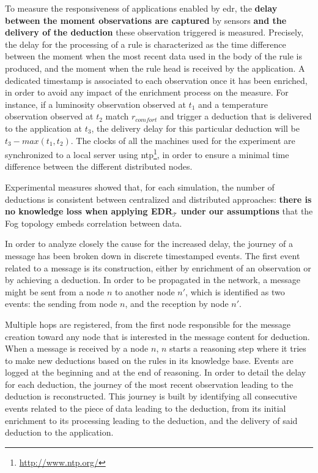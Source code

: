 \documentclass[sw]{iosart2x}
\newcommand{\edrt}{EDR$_{\mathcal{T}}$\xspace}
\begin{document}
To measure the responsiveness of applications enabled by \gls{edr}, the \textbf{delay between the moment observations are captured} by sensors \textbf{and the delivery of the deduction} these observation triggered is measured.
Precisely, the delay for the processing of a rule is characterized as the time difference between the moment when the most recent data used in the body of the rule is produced, and the moment when the rule head is received by the application.
A dedicated time\-stamp is associated to each observation once it has been enriched, in order to avoid any impact of the enrichment process on the measure.
For instance, if a luminosity observation observed at $t_{1}$ and a temperature observation observed at $t_{2}$ match $r_{comfort}$ and trigger a deduction that is delivered to the application at $t_{3}$, the delivery delay for this particular deduction will be $t_3 - max(t_1, t_2)$.
The clocks of all the machines used for the experiment are synchronized to a local server using \gls{ntp}\footnote{\url{http://www.ntp.org/}}, in order to ensure a minimal time difference between the different distributed nodes.

Experimental measures showed that, for each simulation, the number of deductions is consistent between centralized and distributed approaches: \textbf{there is no knowledge loss when applying \edrt under our assumptions} that the Fog topology embeds correlation between data.

In order to analyze closely the cause for the increased delay, the journey of a message has been broken down in discrete timestamped events. 
The first event related to a message is its construction, either by enrichment of an observation or by achieving a deduction.
In order to be propagated in the network, a message might be sent from a node $n$ to another node $n'$, which is identified as two events: the sending from node $n$, and the reception by node $n'$.

Multiple hops are registered, from the first node responsible for the message creation toward any node that is interested in the message content for deduction.
When a message is received by a node $n$, $n$ starts a reasoning step where it tries to make new deductions based on the rules in its knowledge base. 
Events are logged at the beginning and at the end of reasoning.
In order to detail the delay for each deduction, the journey of the most recent observation leading to the deduction is reconstructed.
This journey is built by identifying all consecutive events related to the piece of data leading to the deduction, from its initial enrichment to its processing leading to the deduction, and the delivery of said deduction to the application.
\end{document}
